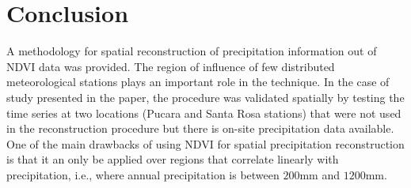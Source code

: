 \documentclass[10pt,letterpaper,conference]{ieeeconf}
\begin{document}
\section{Conclusion}

A methodology for spatial reconstruction of precipitation information out of 
NDVI data was provided. The region of influence of few distributed 
meteorological stations plays an important role in the technique. In the case 
of study presented in the paper, the procedure was validated spatially by 
testing the time series at two locations (Pucara and Santa Rosa stations) 
 that were not used in the reconstruction procedure but there is on-site 
precipitation data available. One of the main drawbacks of using NDVI for 
spatial precipitation reconstruction is that it an only be applied over regions 
that correlate linearly with precipitation,  i.e., where annual precipitation 
is between $200$mm and $1200$mm.   
\end{document}
